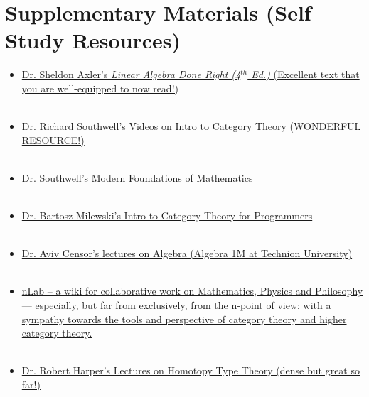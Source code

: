 
\chapter*{Supplementary Materials (Self Study Resources)}
\addtocounter{chapter}{1} %

\begin{itemize}
    \item \href{https://linear.axler.net/LADR4e.pdf}{Dr. Sheldon Axler's \textit{Linear Algebra Done Right (4$^{th}$ Ed.)} (Excellent text that you are well-equipped to now read!)} \\ \\
    \item \href{https://youtube.com/playlist?list=PLCTMeyjMKRkoS699U0OJ3ymr3r01sI08l}{Dr. Richard Southwell's Videos on Intro to Category Theory (WONDERFUL RESOURCE!)} \\ \\
    \item \href{https://youtube.com/playlist?list=PLCTMeyjMKRkqTM2-9HXH81tvpdROs-nz3}{Dr. Southwell's Modern Foundations of Mathematics} \\ \\
    \item \href{https://youtube.com/playlist?list=PLbgaMIhjbmEnaH_LTkxLI7FMa2HsnawM_}{Dr. Bartosz Milewski's Intro to Category Theory for Programmers} \\ \\
    \item \href{https://youtube.com/playlist?list=PLW3u28VuDAHJNrf3JCgT0GG_rjFVz0-j9}{Dr. Aviv Censor's lectures on Algebra (Algebra 1M at Technion University)} \\ \\
    \item \href{https://ncatlab.org/nlab/show/HomePage}{ nLab -- a wiki for collaborative work on Mathematics, Physics and Philosophy — especially, but far from exclusively, from the n-point of view: with a sympathy towards the tools and perspective of category theory and higher category theory.} \\ \\
    \item \href{https://youtube.com/playlist?list=PL1-2D_rCQBarjdqnM21sOsx09CtFSVO6Z}{Dr. Robert Harper's Lectures on Homotopy Type Theory (dense but great so far!)} \\ \\

\end{itemize}
